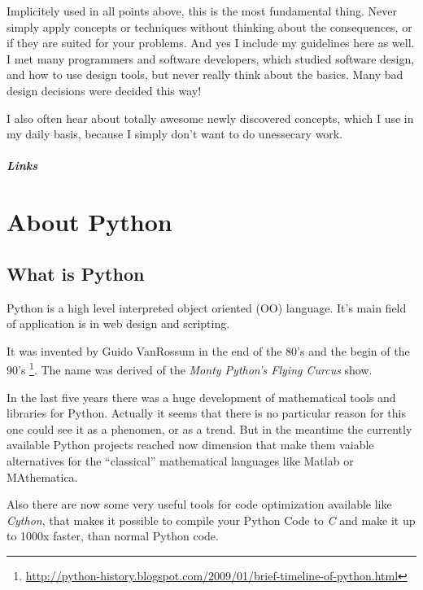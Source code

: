 \documentclass[letterpaper,10pt,english]{manual}
\begin{document}
Implicitely used in all points above, this is the most fundamental thing.
Never simply apply concepts or techniques without thinking about the consequences,
or if they are suited for your problems. And yes I include my guidelines here as well.
I met many programmers and software developers, which studied software design, and
how to use design tools, but never really think about the basics. Many bad design decisions
were decided this way!

I also often hear about totally awesome newly discovered concepts, which I use in my daily basis,
because I simply don't want to do unessecary work.
\paragraph{Links}

\resetcurrentobjects
\hypertarget{--doc-Python}{}

\chapter{About Python}


\section{What is Python}

Python is a high level interpreted object oriented (OO) language.
It's main field of application is in web design and scripting.

It was invented by Guido VanRossum in the end of the 80's and the begin of
the 90's \footnote{
\href{http://python-history.blogspot.com/2009/01/brief-timeline-of-python.html}{http://python-history.blogspot.com/2009/01/brief-timeline-of-python.html}
}. The name was derived of the \emph{Monty Python's Flying Curcus}
show.

In the last five years there was a huge development of mathematical tools
and libraries for Python. Actually it seems that there is no particular reason for
this one could see it as a phenomen, or as a trend. But in the meantime the currently
available Python projects reached now dimension that make them vaiable alternatives
for the ``classical'' mathematical languages like Matlab or MAthematica.

Also there are now some very useful tools for code optimization available like \emph{Cython},
that makes it possible to compile your Python Code to \emph{C} and make it up to 1000x faster,
than normal Python code.
\end{document}
